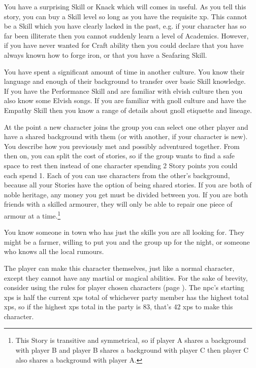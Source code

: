\begin{multicols}{2}
You have a surprising Skill or Knack which will comes in useful. As you tell this story, you can buy a Skill level so long as you have the requisite \gls{xp}. This cannot be a Skill which you have clearly lacked in the past, e.g. if your character has so far been illiterate then you cannot suddenly learn a level of Academics. However, if you have never wanted for Craft ability then you could declare that you have always known how to forge iron, or that you have a Seafaring Skill.

You have spent a significant amount of time in another culture. You know their language and enough of their background to transfer over basic Skill knowledge. If you have the Performance Skill and are familiar with elvish culture then you also know some Elvish songs. If you are familiar with gnoll culture and have the Empathy Skill then you know a range of details about gnoll etiquette and lineage.

At the point a new character joins the group you can select one other player and have a shared background with them (or with another, if your character is new). You describe how you previously met and possibly adventured together. From then on, you can split the cost of stories, so if the group wants to find a safe space to rest then instead of one character spending 2 Story points you could each spend 1. Each of you can use characters from the other's background, because all your Stories have the option of being shared stories. If you are both of noble heritage, any money you get must be divided between you. If you are both friends with a skilled armourer, they will only be able to repair one piece of armour at a time.\footnote{This Story is transitive and symmetrical, so if player A shares a background with player B and player B shares a background with player C then player C also shares a background with player A.}

You know someone in town who has just the skills you are all looking for.
They might be a farmer, willing to put you and the group up for the night, or someone who knows all the local rumours.

The player can make this character themselves, just like a normal character, except they cannot have any martial or magical abilities.
For the sake of brevity, consider using the rules for player chosen characters (page \pageref{playerchosen}).
The \gls{npc}'s starting \glspl{xp} is half the current \glspl{xp} total of whichever party member has the highest total \glspl{xp}, so if the highest \glspl{xp} total in the party is 83, that's 42 \glspl{xp} to make this character.


\end{multicols}
